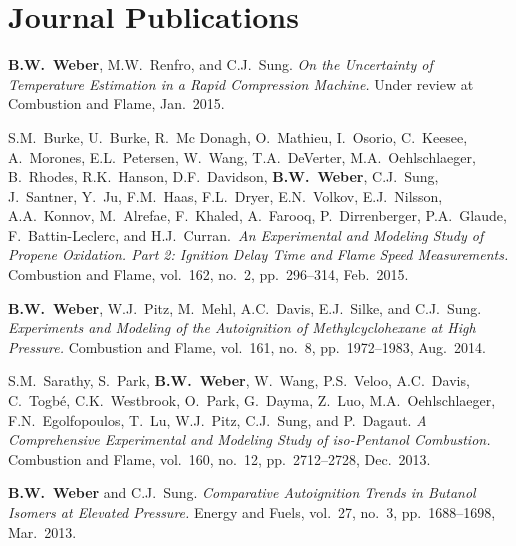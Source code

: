 \section{{\sectionfont Journal Publications}}

\begin{bibmune}
\item \textbf{B.W.\ Weber}, M.W.\ Renfro, and C.J.\ Sung. \textit{On
        the Uncertainty of Temperature Estimation in a Rapid
        Compression Machine.} Under review at Combustion and Flame,
        Jan.\ 2015.

\item S.M.\ Burke, U.\ Burke, R.\ Mc Donagh, O.\ Mathieu, I.\ Osorio,
        C.\ Keesee, A.\ Morones, E.L.\ Petersen, W.\ Wang, T.A.\ DeVerter,
        M.A.\ Oehlschlaeger, B.\ Rhodes, R.K.\ Hanson, D.F.\ Davidson,
        \textbf{B.W.\ Weber}, C.J.\ Sung, J.\ Santner, Y.\ Ju, F.M.\ Haas,
        F.L.\ Dryer, E.N.\ Volkov, E.J.\ Nilsson, A.A.\ Konnov, M.\ Alrefae,
        F.\ Khaled, A.\ Farooq, P.\ Dirrenberger, P.A.\ Glaude,
        F.\ Battin-Leclerc, and H.J.\ Curran.\ \textit{An Experimental and
        Modeling Study of Propene Oxidation. Part 2: Ignition Delay Time
        and Flame Speed Measurements.} Combustion and Flame, vol.\ 162, no.\ 2,
        pp.\ 296--314, Feb.\ 2015. \\ 

\item \textbf{B.W.\ Weber}, W.J.\ Pitz, M.\ Mehl, A.C.\ Davis,
        E.J.\ Silke, and C.J.\ Sung. \textit{Experiments and
        Modeling of the Autoignition of Methylcyclohexane at High
        Pressure.} Combustion and Flame, vol.\ 161, no.\ 8, pp.\
        1972--1983, Aug.\ 2014.

\item S.M.\ Sarathy, S.\ Park, \textbf{B.W.\ Weber}, W.\ Wang,
        P.S.\ Veloo, A.C.\ Davis, C.\ Togbé, C.K.\ Westbrook, O.\ Park,
        G.\ Dayma, Z.\ Luo, M.A.\ Oehlschlaeger, F.N.\ Egolfopoulos,
        T.\ Lu, W.J.\ Pitz, C.J.\ Sung, and P.\ Dagaut. \textit{A
        Comprehensive Experimental and Modeling Study of iso-Pentanol
        Combustion.} Combustion and Flame, vol.\ 160, no.\ 12, pp.\
        2712--2728, Dec.\ 2013. 

\item \textbf{B.W.\ Weber} and C.J.\ Sung. \textit{Comparative
        Autoignition Trends in Butanol Isomers at Elevated Pressure.}
        Energy and Fuels, vol.\ 27, no.\ 3, pp.\ 1688--1698, Mar.\ 2013. \\
        \doi{10.1021/ef302195c}


\end{bibmune}
